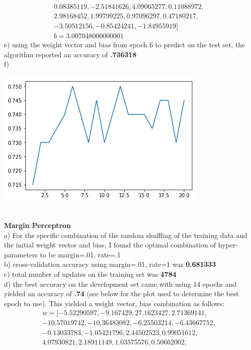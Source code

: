 \documentclass[11pt,a4paper]{article}
\begin{document}
\begin{enumerate}
\begin{gather}
         0.08385119,  -2.51841626,   4.09065277,   0.11088972,\\
         2.98168452,   1.99799225,   0.97096297,   0.47180217,\\
        -3.50512156,  -0.85424241,  -1.84955919] \\
			b = 3.007048000000001
			\end{gather}
			e) using the weight vector and bias from epoch 6 to predict on the test set, the algorithm reported an accuracy of \textbf{.736318} \\
			f)
			\begin{center}
				\includegraphics[width=0.7\linewidth]{decaying_plot}
			\end{center}
			~\\
			\textbf{Margin Perceptron}    \\
			a) For the specific combination of the random shuffling of the training data and the initial weight vector and bias, I found the optimal combination of hyper-parameters to be margin=.01, rate=.1  \\
			b) cross-validation accuracy using margin=.01, rate=1 was \textbf{0.681333}\\
			c) total number of updates on the training set was \textbf{4784}\\
			d) the best accuracy on the development set came with using 14 epochs and yielded an accuracy of \textbf{.74} (see below for the plot used to determine the best epoch to use). This yielded a weight vector, bias combination as follows:\\
			\begin{gather}
			w = [ -5.52290597,  -9.167429  ,  27.1623427 ,   2.71369141,\\
       -10.57019742, -10.36483082,  -6.25503214,  -6.43667752,\\
        -0.13033783,  -1.05421796,   2.44502523,   0.99051612,\\
         4.07930821,   2.18911149,   1.03575576,   0.50662002,\\

\end{gather}
\end{enumerate}
\end{document}
